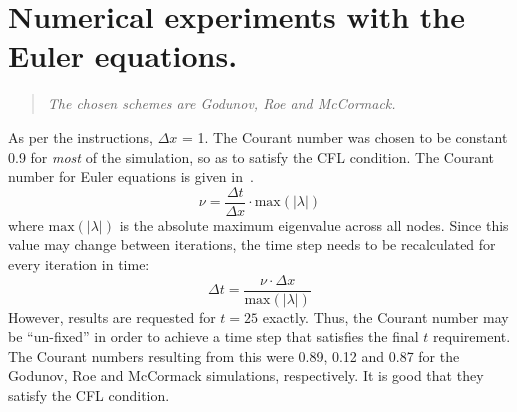 \section{Numerical experiments with the Euler equations.}
\begin{quote}
\em The chosen schemes are Godunov, Roe and McCormack.
\end{quote}
As per the instructions, $\Delta x$ = 1. The Courant number was chosen to be constant 0.9 for \emph{most} of the simulation, so as to satisfy the CFL condition. The Courant number for Euler equations is given in~.
\begin{equation}
    \label{eq:courant_euler}
    \nu = \dfrac{\Delta t}{\Delta x}\cdot\mathrm{max}(|\lambda|)
\end{equation}
where $\mathrm{max}(|\lambda|)$ is the absolute maximum eigenvalue across all nodes. Since this value may change between iterations, the time step needs to be recalculated for every iteration in time:
\begin{equation}
    \Delta t = \dfrac{\nu\cdot\Delta x}{\mathrm{max}(|\lambda|)}
\end{equation}
However, results are requested for $t = 25$ exactly. Thus, the Courant number may be ``un-fixed'' in order to achieve a time step that satisfies the final $t$ requirement. The Courant numbers resulting from this were 0.89, 0.12 and 0.87 for the Godunov, Roe and McCormack simulations, respectively. It is good that they satisfy the CFL condition.

